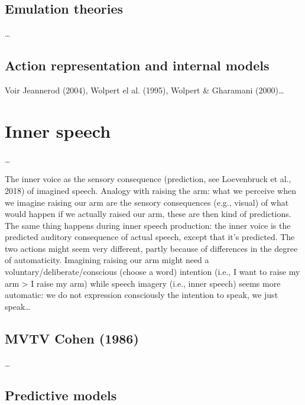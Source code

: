 \documentclass[12pt,]{book}
\begin{document}
\subsection{Emulation theories}\label{emulation-theories}

\ldots{}

\subsection{Action representation and internal
models}\label{action-representation-and-internal-models}

Voir Jeannerod (2004), Wolpert el al. (1995), Wolpert \& Gharamani
(2000)\ldots{}

\section{Inner speech}\label{inner-speech}

\ldots{}

The inner voice as the sensory consequence (prediction, see Loevenbruck
et al., 2018) of imagined speech. Analogy with raising the arm: what we
perceive when we imagine raising our arm are the sensory consequences
(e.g., visual) of what would happen if we actually raised our arm, these
are then kind of predictions. The same thing happens during inner speech
production: the inner voice is the predicted auditory consequence of
actual speech, except that it's predicted. The two actions might seem
very different, partly because of differences in the degree of
automaticity. Imagining raising our arm might need a
voluntary/deliberate/conscious (choose a word) intention (i.e., I want
to raise my arm \textgreater{} I raise my arm) while speech imagery
(i.e., inner speech) seems more automatic: we do not expression
consciously the intention to speak, we just speak\ldots{}

\subsection{MVTV Cohen (1986)}\label{mvtv-cohen-1986}

\ldots{}

\subsection{Predictive models}\label{predictive-models}
\end{document}
